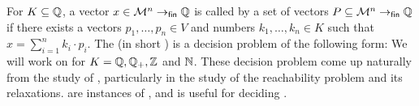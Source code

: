 \documentclass[a4paper,11pt]{article}
\begin{document}
For $K\subseteq\mathbb{Q}$,
a vector $x\in\mathcal{M}^n \to_{\mathsf{fin}} \mathbb{Q}$ is called  by a set of vectors $P\subseteq\mathcal{M}^n \to_{\mathsf{fin}} \mathbb{Q}$ if there exists a vectors $p_1,\dots,p_n\in V$ and numbers $k_1,\dots,k_n\in K$ such that
$x = \sum_{i=1}^n k_i\cdot p_i$.
The  (in short ) is a decision problem of the following form:
%
We will work on  for $K = \mathbb{Q},\mathbb{Q}_+,\mathbb{Z}$ and $\mathbb{N}$.
These decision problem come up naturally from the study of ,
particularly in the study of the reachability problem and its relaxations.
 are instances of \ofspan{\N}{\M},
and \ofspan{\Q_+}{\M} is useful for deciding .
%
%
%
%
\end{document}
